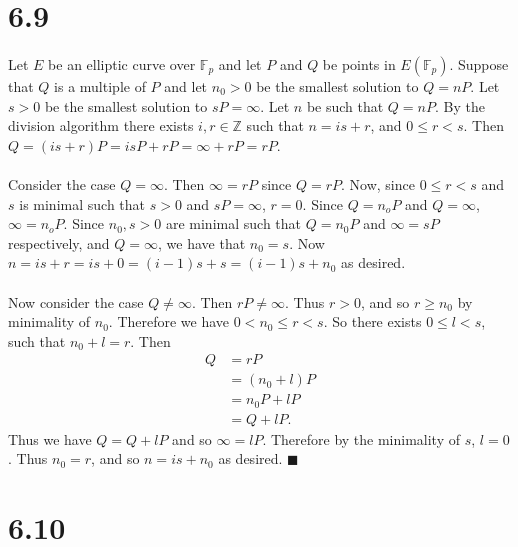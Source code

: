 \documentclass[letterpaper,12pt,oneside,onecolumn]{report}
\begin{document}
\section*{6.9}
\paragraph{}
Let $E$ be an elliptic curve over $\mathbb{F}_p$ and let $P$ and $Q$ be points in $E(\mathbb{F}_p)$. Suppose that $Q$ is a multiple of $P$ and let $n_0 > 0$ be the smallest solution to $Q = nP$. Let $s > 0$ be the smallest solution to $sP = \infty$. Let $n$ be such that $Q = nP$. By the division algorithm there exists $i, r \in \mathbb{Z}$ such that $n= is + r$, and $0 \leq r < s$. Then $Q = (is + r)P = isP + rP = \infty + rP = rP$.
\paragraph{}
Consider the case $Q = \infty$. Then $\infty = rP$ since $Q = rP$. Now, since $0 \leq r < s$ and $s$ is minimal such that $s>0$ and $sP = \infty$, $r = 0$. Since $Q = n_oP$ and $Q = \infty$, $\infty = n_oP$. Since $n_0, s > 0$ are minimal such that $Q = n_0P$ and $\infty = sP$ respectively, and $Q = \infty$, we have that $n_0 = s$. Now $n = is + r = is + 0 = (i-1)s + s = (i-1)s + n_0$ as desired.
\paragraph{}
Now consider the case $Q \neq \infty$. Then $rP \neq \infty$. Thus $r > 0$, and so $r \geq n_0$ by minimality of $n_0$. Therefore we have $0 < n_0 \leq r < s$. So there exists $0 \leq l < s$, such that $n_0 + l = r$. Then
\begin{align*}
Q &= rP \\
&= (n_0 + l)P \\
&= n_0P + lP \\
&= Q + lP.
\end{align*}
Thus we have $Q = Q + lP$ and so $\infty = lP$. Therefore by the minimality of $s$, $l = 0$. Thus $n_0 = r$, and so $n = is + n_0$ as desired. $\blacksquare$
\section*{6.10}
\end{document}
